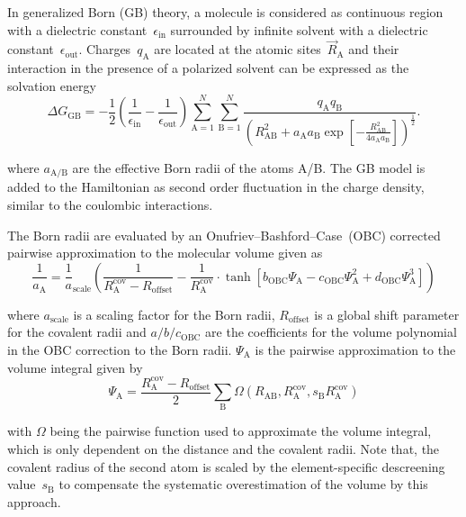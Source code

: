 In generalized Born (GB) theory,\cite{onufriev2019} a molecule is considered as
continuous region with a dielectric constant~$\epsilon_\text{in}$ surrounded by
infinite solvent with a dielectric constant~$\epsilon_\text{out}$.
Charges~$q_\text{A}$ are located at the atomic sites~$\vec R_\text{A}$
and their interaction in the presence of a polarized solvent can be
expressed as the solvation energy
%
\begin{equation}
  \Delta G_\text{GB} =
  -\frac12 \left(\frac1{\epsilon_\text{in}}-\frac1{\epsilon_\text{out}}\right)
  \sum_{\text{A}=1}^N\sum_{\text{B}=1}^N\frac{q_\text{A}q_\text{B}}
  {\left(R^2_\text{AB} + a_\text{A}a_\text{B}\exp\left[-\frac{R^2_\text{AB}}
  {4a_\text{A}a_\text{B}}\right]\right)^{\frac12}}.
\end{equation}

where $a_\text{A/B}$ are the effective Born radii of the atoms A/B.
The GB model is added to the Hamiltonian as second order fluctuation
in the charge density, similar to the coulombic interactions.

The Born radii are evaluated by an Onufriev--Bashford--Case~(OBC) corrected
pairwise approximation to the molecular volume given as
%
\begin{equation}
  \frac1{a_\text{A}} = \frac1a_\text{scale}\left(
  \frac1{R^\text{cov}_\text{A} - R_\text{offset}}
  - \frac1{R^\text{cov}_\text{A}}
  \cdot \tanh\left[b_\text{OBC}\Psi_\text{A}
  - c_\text{OBC}\Psi_\text{A}^2 + d_\text{OBC}\Psi_\text{A}^3\right]
  \right)
\end{equation}

where $a_\text{scale}$ is a scaling factor for the Born radii,
$R_\text{offset}$ is a global shift parameter for the covalent radii and
$a/b/c_\text{OBC}$ are the coefficients for the volume polynomial in
the OBC correction to the Born radii.
$\Psi_\text{A}$ is the pairwise approximation to the volume integral
given by
%
\begin{equation}
  \Psi_\text{A} = \frac{R^\text{cov}_\text{A} - R_\text{offset}}2
  \sum_\text{B} \Omega(R_\text{AB}, R^\text{cov}_\text{A}, s_\text{B}R^\text{cov}_\text{A})
\end{equation}

with $\Omega$ being the pairwise function used to approximate the
volume integral, which is only dependent on the distance and the
covalent radii. Note that, the covalent radius of the second atom
is scaled by the element-specific descreening value~$s_\text{B}$
to compensate the systematic overestimation of the volume by this
approach.

